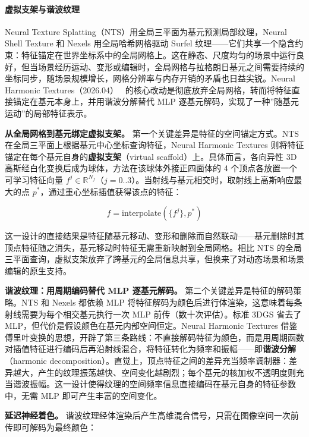 \paragraph{虚拟支架与谐波纹理}

Neural Texture Splatting（NTS）用全局三平面为基元预测局部纹理，Neural Shell Texture 和 Nexels 用全局哈希网格驱动 Surfel 纹理——它们共享一个隐含约束：特征锚定在世界坐标系中的全局网格上。这在静态、尺度均匀的场景中运行良好，但当场景经历运动、变形或编辑时，全局网格与拉格朗日基元之间需要持续的坐标同步，随场景规模增长，网格分辨率与内存开销的矛盾也日益尖锐。Neural Harmonic Textures（2026.04）~\cite{2604_01204} 的核心改动是彻底放弃全局网格，转而将特征直接锚定在基元本身上，并用谐波分解替代 MLP 逐基元解码，实现了一种”随基元运动”的局部特征表示。

\smallskip
\noindent\textbf{从全局网格到基元绑定虚拟支架。}
第一个关键差异是特征的空间锚定方式。NTS 在全局三平面上根据基元中心坐标查询特征，Neural Harmonic Textures 则将特征锚定在每个基元自身的\textbf{虚拟支架}（virtual scaffold）上。具体而言，各向异性 3D 高斯经白化变换后成为球体，方法在该球体外接正四面体的 4 个顶点各放置一个可学习特征向量 $f^j \in \mathbb{R}^{N_f}$（$j=0..3$）。当射线与基元相交时，取射线上高斯响应最大的点 $p^*$，通过重心坐标插值获得该点的特征：

\begin{equation}
    f = \mathrm{interpolate}(\{f^j\}, p^*)
\end{equation}

这一设计的直接结果是特征随基元移动、变形和删除而自然联动——基元删除时其顶点特征随之消失，基元移动时特征无需重新映射到全局网格。相比 NTS 的全局三平面查询，虚拟支架放弃了跨基元的全局信息共享，但换来了对动态场景和场景编辑的原生支持。

\smallskip
\noindent\textbf{谐波纹理：用周期编码替代 MLP 逐基元解码。}
第二个关键差异是特征的解码策略。NTS 和 Nexels 都依赖 MLP 将特征解码为颜色后进行体渲染，这意味着每条射线需要为每个相交基元执行一次 MLP 前传（数十次评估）。标准 3DGS 省去了 MLP，但代价是假设颜色在基元内部空间恒定。Neural Harmonic Textures 借鉴傅里叶变换的思想，开辟了第三条路线：不直接解码特征为颜色，而是用周期函数对插值特征进行编码后再沿射线混合，将特征转化为频率和振幅——即\textbf{谐波分解}（harmonic decomposition）。直觉上，顶点特征之间的差异充当频率调制器：差异越大，产生的纹理振荡越快、空间变化越剧烈；每个基元的核加权不透明度则充当谐波振幅。这一设计使得纹理的空间频率信息直接编码在基元自身的特征参数中，无需 MLP 即可产生丰富的空间变化。

\smallskip
\noindent\textbf{延迟神经着色。}
谐波纹理经体渲染后产生高维混合信号，只需在图像空间一次前传即可解码为最终颜色：

